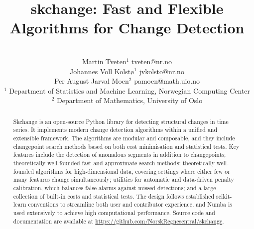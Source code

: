 \documentclass[twoside,11pt]{article}
\begin{document}
\title{skchange: Fast and Flexible Algorithms for Change Detection}

\author{\\
    \name Martin Tveten$^{1}$ \hfill \email tveten@nr.no\\
    \name Johannes Voll Kolstø$^{1}$ \hfill \email jvkolsto@nr.no\\
    \name Per August Jarval Moen$^{2}$ \hfill \email pamoen@math.uio.no\\
    \addr $^{1}$ Department of Statistics and Machine Learning, Norwegian Computing Center\\
    \addr $^{2}$ Department of Mathematics, University of Oslo
}


\maketitle

\begin{abstract}
Skchange is an open-source Python library for detecting structural changes in time series.
It implements modern change detection algorithms within a unified and extensible framework.
The algorithms are modular and composable, and they include changepoint search methods based on both cost minimisation and statistical tests.
Key features include
the detection of anomalous segments in addition to changepoints;
theoretically well-founded fast and approximate search methods;
theoretically well-founded algorithms for high-dimensional data, covering settings where either few or many features change simultaneously;
utilities for automatic and data-driven penalty calibration, which balances false alarms against missed detections;
and a large collection of built-in costs and statistical tests.
The design follows established scikit-learn conventions to streamline both user and contributor experience, and Numba is used extensively to achieve high computational performance.
Source code and documentation are available at \url{https://github.com/NorskRegnesentral/skchange}.
\end{abstract}

\end{document}
